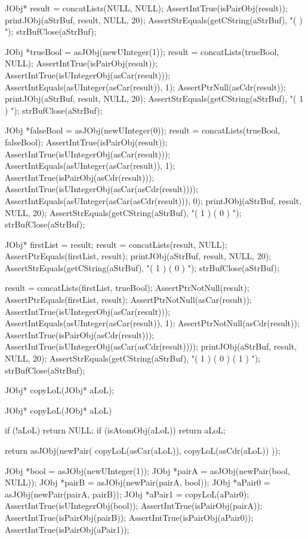   JObj* result = concatLists(NULL, NULL);
  AssertIntTrue(isPairObj(result));
  printJObj(aStrBuf, result, NULL, 20);
  AssertStrEquals(getCString(aStrBuf), "(  )  ");
  strBufClose(aStrBuf);
  
  JObj *trueBool  = asJObj(newUInteger(1));
  result = concatLists(trueBool, NULL);
  AssertIntTrue(isPairObj(result));
  AssertIntTrue(isUIntegerObj(asCar(result)));
  AssertIntEquals(asUInteger(asCar(result)), 1);
  AssertPtrNull(asCdr(result));
  printJObj(aStrBuf, result, NULL, 20);
  AssertStrEquals(getCString(aStrBuf), "( 1 )  ");
  strBufClose(aStrBuf);
  
  JObj *falseBool = asJObj(newUInteger(0));
  result = concatLists(trueBool, falseBool);
  AssertIntTrue(isPairObj(result));
  AssertIntTrue(isUIntegerObj(asCar(result)));
  AssertIntEquals(asUInteger(asCar(result)), 1);
  AssertIntTrue(isPairObj(asCdr(result)));
  AssertIntTrue(isUIntegerObj(asCar(asCdr(result))));
  AssertIntEquals(asUInteger(asCar(asCdr(result))), 0);
  printJObj(aStrBuf, result, NULL, 20);
  AssertStrEquals(getCString(aStrBuf), "( 1 ) ( 0 )  ");
  strBufClose(aStrBuf);
  
  JObj* firstList = result;
  result = concatLists(result, NULL);
  AssertPtrEquals(firstList, result);
  printJObj(aStrBuf, result, NULL, 20);
  AssertStrEquals(getCString(aStrBuf), "( 1 ) ( 0 )  ");
  strBufClose(aStrBuf);
  
  result = concatLists(firstList, trueBool);
  AssertPtrNotNull(result);
  AssertPtrEquals(firstList, result);
  AssertPtrNotNull(asCar(result));
  AssertIntTrue(isUIntegerObj(asCar(result)));
  AssertIntEquals(asUInteger(asCar(result)), 1);
  AssertPtrNotNull(asCdr(result));
  AssertIntTrue(isPairObj(asCdr(result)));
  AssertIntTrue(isUIntegerObj(asCar(asCdr(result))));
  printJObj(aStrBuf, result, NULL, 20);
  AssertStrEquals(getCString(aStrBuf), "( 1 ) ( 0 ) ( 1 )  ");
  strBufClose(aStrBuf);
\stopCTest
\stopTestCase
\stopTestSuite

\startTestSuite[copyLoL]

\startCHeader
JObj* copyLoL(JObj* aLoL);
\stopCHeader

\startCCode
JObj* copyLoL(JObj* aLoL) {
  if (!aLoL) return NULL;
  if (isAtomObj(aLoL)) return aLoL;

  return asJObj(newPair(
    copyLoL(asCar(aLoL)),
    copyLoL(asCdr(aLoL))
  ));
}
\stopCCode


\startCTest
  JObj *bool   = asJObj(newUInteger(1));
  JObj *pairA  = asJObj(newPair(bool, NULL));
  JObj *pairB  = asJObj(newPair(pairA, bool));
  JObj *aPair0 = asJObj(newPair(pairA, pairB));
  JObj *aPair1 = copyLoL(aPair0);
  AssertIntTrue(isUIntegerObj(bool));
  AssertIntTrue(isPairObj(pairA));
  AssertIntTrue(isPairObj(pairB));
  AssertIntTrue(isPairObj(aPair0));
  AssertIntTrue(isPairObj(aPair1));

